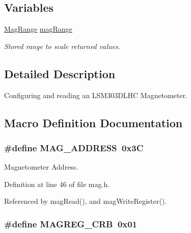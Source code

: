 \subsection*{Variables}
\begin{DoxyCompactItemize}
\item 
\hyperlink{group__mag_ga3af649d913d146d6654db2354d88c18a}{Mag\-Range} \hyperlink{group__mag_gaae12e12b371d0bcebe05462384a519a2}{mag\-Range}
\begin{DoxyCompactList}\small\item\em Stored range to scale returned values. \end{DoxyCompactList}\end{DoxyCompactItemize}


\subsection{Detailed Description}
Configuring and reading an L\-S\-M303\-D\-L\-H\-C Magnetometer. 

\subsection{Macro Definition Documentation}
\hypertarget{group__mag_gade4e63fac819c67040e374f08d2d7230}{
\subsubsection[{M\-A\-G\-\_\-\-A\-D\-D\-R\-E\-S\-S}]{\setlength{\rightskip}{0pt plus 5cm}\#define M\-A\-G\-\_\-\-A\-D\-D\-R\-E\-S\-S~0x3\-C}}\label{group__mag_gade4e63fac819c67040e374f08d2d7230}


Magnetometer Address. 



Definition at line 46 of file mag.\-h.



Referenced by mag\-Read(), and mag\-Write\-Register().

\hypertarget{group__mag_ga42f59dd3e4a9cb4d8d4dd4a1019b6ab5}{
\subsubsection[{M\-A\-G\-R\-E\-G\-\_\-\-C\-R\-B}]{\setlength{\rightskip}{0pt plus 5cm}\#define M\-A\-G\-R\-E\-G\-\_\-\-C\-R\-B~0x01}}\label{group__mag_ga42f59dd3e4a9cb4d8d4dd4a1019b6ab5}


